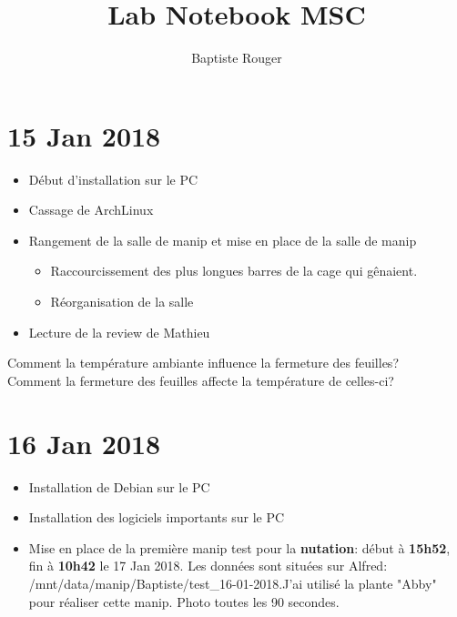 \documentclass[10pt,a4paper]{article}
\author{Baptiste Rouger}
\title{Lab Notebook MSC}
\begin{document}
\maketitle

\tableofcontents

\newpage

\section{15 Jan 2018}

\begin{itemize}
        \item Début d'installation sur le PC
        \item Cassage de ArchLinux
        \item Rangement de la salle de manip et mise en place de la salle de manip
                \begin{itemize}
                        \item Raccourcissement des plus longues barres de la cage qui gênaient.
                        \item Réorganisation de la salle
                \end{itemize}
        \item Lecture de la review de Mathieu
\end{itemize}
\noindent Comment la température ambiante influence la fermeture des feuilles? \\
Comment la fermeture des feuilles affecte la température de celles-ci?

\section{16 Jan 2018}
\begin{itemize}
        \item Installation de Debian sur le PC
        \item Installation des logiciels importants sur le PC
        \item Mise en place de la première manip test pour la \textbf{nutation}: début à \textbf{15h52}, fin à \textbf{10h42} le 17 Jan 2018. Les données sont situées sur Alfred: /mnt/data/manip/Baptiste/test\_16-01-2018.J'ai utilisé la plante "Abby" pour réaliser cette manip. Photo toutes les 90 secondes.
\end{itemize}
\end{document}
